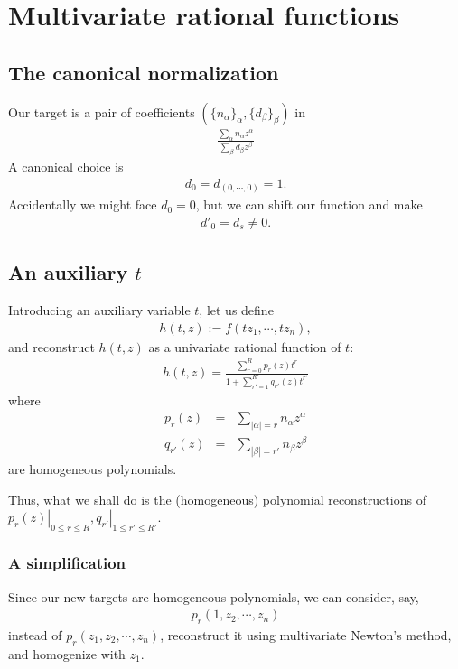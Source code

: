 \documentclass[11pt]{book}
\begin{document}






\section{Multivariate rational functions}
\subsection{The canonical normalization}
Our target is a pair of coefficients $(\{ n_\alpha\}_\alpha, \{ d_\beta\}_\beta)$ in
\begin{eqnarray}
\frac{\sum_\alpha n_\alpha z^\alpha}{\sum_\beta d_\beta z^\beta}
\end{eqnarray}
A canonical choice is
\begin{eqnarray}
d_0 = d_{(0,\cdots,0)} = 1.
\end{eqnarray}
Accidentally we might face $d_0 = 0$, but we can shift our function and make
\begin{eqnarray}
d'_0 = d_{s} \neq 0.
\end{eqnarray}

\subsection{An auxiliary $t$}
Introducing an auxiliary variable $t$, let us define
\begin{eqnarray}
h(t,z) := f(tz_1, \cdots, tz_n),
\end{eqnarray}
and reconstruct $h(t,z)$ as a univariate rational function of $t$:
\begin{eqnarray}
h(t,z) = \frac{\sum_{r=0}^R p_r(z) t^r}{1+ \sum_{r'=1}^{R'} q_{r'}(z) t^{r'}}
\end{eqnarray}
where
\begin{eqnarray}
p_r(z) &=& \sum_{|\alpha| = r} n_\alpha z^\alpha \\
q_{r'}(z) &=& \sum_{|\beta| = r'} n_\beta z^\beta
\end{eqnarray}
are homogeneous polynomials.

Thus, what we shall do is the (homogeneous) polynomial reconstructions of $\left. p_r(z) \right|_{0 \leq r \leq R}, \left. q_{r'} \right|_{1 \leq r' \leq R'}$.

\subsubsection{A simplification}
Since our new targets are homogeneous polynomials, we can consider, say,
\begin{eqnarray}
p_r(1, z_2, \cdots, z_n)
\end{eqnarray}
instead of $p_r(z_1, z_2, \cdots, z_n)$, reconstruct it using multivariate Newton's method, and homogenize with $z_1$.
\end{document}
